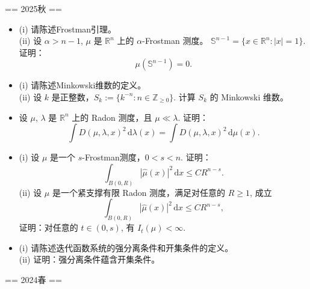 
== 2025秋 ==

\begin{itemize}
    \item[1.] (i) 请陈述Frostman引理。\\
    (ii) 设 $\alpha>n-1$, $\mu$ 是 $\mathbb{R}^n$ 上的 $\alpha$-Frostman 测度。
    $\mathbb{S}^{n-1}=\{x\in \mathbb{R}^n:|x|=1\}$. 证明：
    \[
        \mu(\mathbb{S}^{n-1})=0.
    \]
    \item[2.] (i) 请陈述Minkowski维数的定义。 \\
    (ii) 设 $k$ 是正整数，$S_k := \{k^{-n} : n \in \mathbb{Z}_{\ge 0}\}$. 计算 $S_k$ 的 Minkowski 维数。
    \item[3.] 设 $\mu$, $\lambda$ 是 $\mathbb{R}^n$ 上的 Radon 测度，且 $\mu \ll \lambda$. 证明：
    \[
        \int D(\mu,\lambda,x)^2\,\mathrm{d}\lambda(x) = \int D(\mu,\lambda,x)^2\,\mathrm{d}\mu(x).
    \]
    \item[4.] (i) 设 $\mu$ 是一个 $s$-Frostman测度，$0<s<n$. 证明：
    \[
        \int_{B(0,R)} |\hat{\mu}(x)|^2\,\mathrm{d}x \leq CR^{n-s}.
    \]
    (ii) 设 $\mu$ 是一个紧支撑有限 Radon 测度，满足对任意的 $R\geq 1$, 成立
    \[
        \int_{B(0,R)} |\hat{\mu}(x)|^2\,\mathrm{d}x \leq CR^{n-s},
    \]
    证明：对任意的 $t\in (0,s)$, 有 $I_t(\mu)<\infty$.
    \item[5.] (i) 请陈述迭代函数系统的强分离条件和开集条件的定义。\\
    (ii) 证明：强分离条件蕴含开集条件。
\end{itemize}

== 2024春 ==

